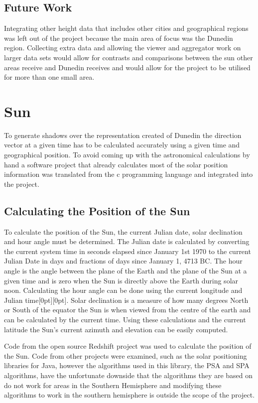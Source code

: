 \documentclass[12pt]{report}
\newcommand{\note}[1]{\raisebox{0pt}[0pt][0pt]{\pdfcomment[open=true]{#1}}}
\begin{document}
\subsection{Future Work}
Integrating other height data that includes other cities and geographical regions was left out of the project because the main area of focus was the Dunedin region. Collecting extra data and allowing the viewer and aggregator work on larger data sets would allow for contrasts and comparisons between the sun other areas receive and Dunedin receives and would allow for the project to be utilised for more than one small area.

\section{Sun}
To generate shadows over the representation created of Dunedin the direction vector at a given time has to be calculated accurately using a given time and geographical position. To avoid coming up with the astronomical calculations by hand a software project that already calculates most of the solar position information was translated from the c programming language and integrated into the project.

\subsection{Calculating the Position of the Sun}
To calculate the position of the Sun, the current Julian date, solar declination and hour angle must be determined. The Julian date is calculated by converting the current system time in seconds elapsed since January 1st 1970 to the current Julian Date in days and fractions of days since January 1, 4713 BC. The hour angle is the angle between the plane of the Earth and the plane of the Sun at a given time and is zero when the Sun is directly above the Earth during solar noon. Calculating the hour angle can be done using the current longitude and Julian time\note{the current timezone is not needed}. Solar declination is a measure of how many degrees North or South of the equator the Sun is when viewed from the centre of the earth and can be calculated by the current time. Using these calculations and the current latitude the Sun's current azimuth and elevation can be easily computed.

Code from the open source Redshift project\cite{redshift} was used to calculate the position of the Sun.  Code from other projects were examined, such as the solar positioning libraries for Java\cite{javasunlib}, however the algorithms used in this library, the PSA\cite{psa} and SPA\cite{spa} algorithms, have the unfortunate downside that the algorithms they are based on do not work for areas in the Southern Hemisphere\cite{southsun} and modifying these algorithms to work in the southern hemisphere is outside the scope of the project.
\end{document}
